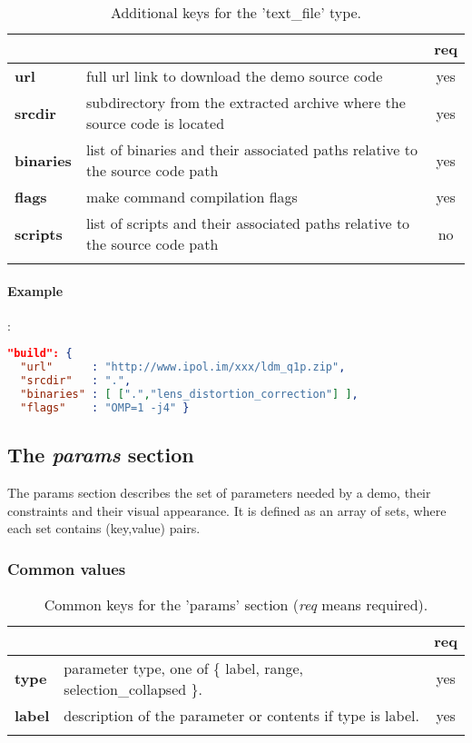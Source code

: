 \begin{longtable}{|>{\bf}L{\linewidth}|L{\linewidth}|c|}
\hline
{}     &  & {\bf req} \tabularnewline 
\hline \hline
 url      & full url link to download the demo source code & yes \\ \hline
 srcdir   & subdirectory from the extracted archive where the source code is 
            located & yes \\ \hline
 binaries & list of binaries and their associated paths relative to the source 
            code path & yes \\ \hline
 flags    & make command compilation flags & yes \\ \hline
 scripts  & list of scripts and their associated paths relative to the source 
            code path & no  \\ \hline
\caption{Additional keys for the 'text\_file' type.}
\end{longtable}

\paragraph{Example}:\\
\begin{lstlisting}[language=json,firstnumber=1]
"build": { 
  "url"      : "http://www.ipol.im/xxx/ldm_q1p.zip", 
  "srcdir"   : ".",
  "binaries" : [ [".","lens_distortion_correction"] ],
  "flags"    : "OMP=1 -j4" }
\end{lstlisting}

\subsection{The \emph{params} section}
The params section describes the set of parameters needed by a demo, their 
constraints and their visual appearance. It is defined as an array of sets, 
where each set contains (key,value) pairs.

\subsubsection{Common values}

\begin{longtable}{|>{\bf}L{\linewidth}|L{\linewidth}|c|}
\hline
      &  & {\bf req} 
\tabularnewline \hline \hline
 type  & parameter type, one of \{ label, range, selection\_collapsed \}.
                     & yes \\ \hline
 label & description of the parameter or contents if type is label. & yes
                      \\ \hline
\caption{Common keys for the 'params' section ({\em req} means required).}
\end{longtable}


